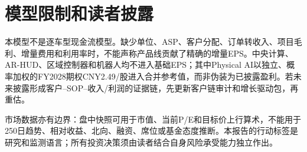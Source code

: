 \section{模型限制和读者披露}

本模型不是逐车型现金流模型。缺少单位、ASP、客户分配、订单转收入、项目毛利、增量费用和利用率时，不能声称产品线贡献了精确的增量EPS。中央计算、AR-HUD、区域控制器和机器人均不进入基础EPS；其中Physical AI以独立、概率加权的FY2028期权CNY2.49/股进入合并参考值，而非伪装为已披露盈利。若未来披露形成客户--SOP--收入/利润的证据链，先更新客户链审计和增长驱动包，再重估。

市场数据亦有边界：盘中快照可用于市值、当前P/E和目标价上行算术，不能用于250日趋势、相对收益、北向、融资、席位或基金态度推断。本报告的行动标签是研究和监测语言；所有投资决策须由读者结合自身风险承受能力独立作出。
